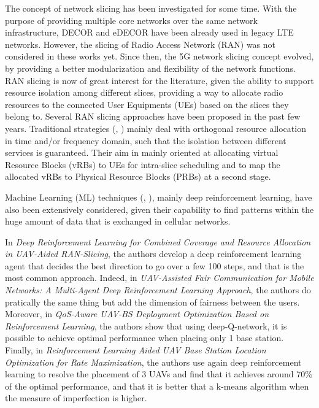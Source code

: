 \documentclass[letterpaper]{article}
\begin{document}
The concept of network slicing has been investigated for some time. With the purpose of providing multiple core networks over the same network infrastructure, DECOR and eDECOR \cite{decor} have been already used in legacy LTE networks. 
However, the slicing of Radio Access Network (RAN) was not considered in these works yet.
Since then, the 5G network slicing concept evolved, by providing a better modularization and flexibility of the network functions.
RAN slicing is now of great interest for the literature, given the ability to support resource isolation among different slices, providing a way to allocate radio resources to the connected User Equipments (UEs) based on the slices they belong to. 
Several RAN slicing approaches have been proposed in the past few years. 
Traditional strategies (\hspace{1sp}\cite{RANslicing1}, \cite{orion})  mainly deal with orthogonal resource allocation in time and/or frequency domain, such that the isolation between different services is guaranteed. Their aim in mainly oriented at allocating virtual Resource Blocks (vRBs) to UEs for intra-slice scheduling and to map the allocated vRBs to Physical Resource Blocks (PRBs) at a second stage.

Machine Learning (ML) techniques (\hspace{1sp}\cite{fairness}, \cite{main_article}), mainly deep reinforcement learning, have also been extensively considered, given their capability to find patterns within the huge amount of data that is exchanged in cellular networks.

In \textit{Deep Reinforcement Learning for Combined Coverage and Resource Allocation in UAV-Aided RAN-Slicing}\cite{main_article}, the authors develop a deep reinforcement learning agent that decides the best direction to go over a few 100 steps, and that is the most common approach.
Indeed, in \textit{UAV-Assisted Fair Communication for Mobile Networks: A Multi-Agent Deep Reinforcement Learning Approach}\cite{fairness}, the authors do pratically the same thing but add the dimension of fairness between the users.
Moreover, in \textit{QoS-Aware UAV-BS Deployment Optimization Based on Reinforcement Learning}\cite{deep-qn}, the authors show that using deep-Q-network, it is possible to achieve optimal performance when placing only 1 base station.
Finally, in \textit{Reinforcement Learning Aided UAV Base Station Location Optimization for Rate Maximization}\cite{rate_max}, the authors use again deep reinforcement learning to resolve the placement of 3 UAVs and find that it achieves around 70\% of the optimal performance, and that it is better that a k-means algorithm when the measure of imperfection is higher.
\end{document}

